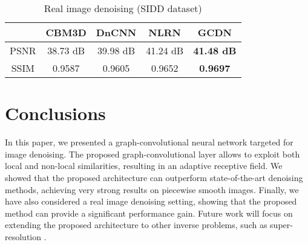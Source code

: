 \documentclass[journal]{IEEEtran}
\begin{document}
\begin{table}[]
\centering
\caption{Real image denoising (SIDD dataset)}
\begin{tabular}{ccccc}
\hline
     & CBM3D    & DnCNN    & NLRN     & GCDN          \\ \hline
PSNR & 38.73 dB & 39.98 dB & 41.24 dB & \textbf{41.48 dB} \\ \hline
SSIM & 0.9587 & 0.9605   & 0.9652   & \textbf{0.9697}   \\ \hline
\end{tabular}
\label{table:real_noise}
\end{table}

\vspace{-0.2cm}
\section{Conclusions} \label{sec:conclusions}
\vspace{-0.2cm}
In this paper, we presented a graph-convolutional neural network targeted for image denoising. The proposed  graph-convolutional layer allows to exploit both local and non-local similarities, resulting in an adaptive receptive field. We showed that the proposed architecture can outperform state-of-the-art denoising methods, achieving very strong results on piecewise smooth images. Finally, we have also considered a real image denoising setting, showing that the proposed method can provide a significant performance gain.
Future work will focus on extending the proposed architecture to other inverse problems, such as super-resolution \cite{dong2014learning,bordone2019deepsum}.



\end{document}
